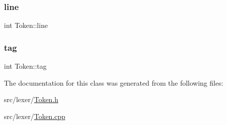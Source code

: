 \subsubsection{\texorpdfstring{line}{line}}
{\footnotesize\ttfamily int Token\+::line}

\mbox{\label{class_token_a2a4b0e1b648c2a9be1976004eb3c4ff0}} 
\subsubsection{\texorpdfstring{tag}{tag}}
{\footnotesize\ttfamily int Token\+::tag}



The documentation for this class was generated from the following files\+:\begin{DoxyCompactItemize}
\item 
src/lexer/\hyperlink{_token_8h}{Token.\+h}\item 
src/lexer/\hyperlink{_token_8cpp}{Token.\+cpp}\end{DoxyCompactItemize}
